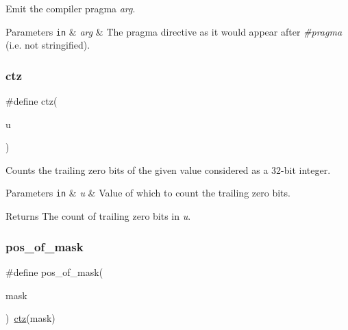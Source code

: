 Emit the compiler pragma {\itshape arg}. 


\begin{DoxyParams}[1]{Parameters}
\mbox{\tt in}  & {\em arg} & The pragma directive as it would appear after {\itshape \#pragma} (i.\+e. not stringified). \\
\hline
\end{DoxyParams}
\mbox{\label{group__doc__driver__hal__utils__macro_gab069bfec305db5213465d3b689836404}} 
\subsubsection{\texorpdfstring{ctz}{ctz}}
{\footnotesize\ttfamily \#define ctz(\begin{DoxyParamCaption}\item[{}]{u }\end{DoxyParamCaption})}



Counts the trailing zero bits of the given value considered as a 32-\/bit integer. 


\begin{DoxyParams}[1]{Parameters}
\mbox{\tt in}  & {\em u} & Value of which to count the trailing zero bits.\\
\hline
\end{DoxyParams}
\begin{DoxyReturn}{Returns}
The count of trailing zero bits in {\itshape u}. 
\end{DoxyReturn}
\mbox{\label{group__doc__driver__hal__utils__macro_ga6e6ec9c159cae4680d073d707063fa0e}} 
\subsubsection{\texorpdfstring{pos\+\_\+of\+\_\+mask}{pos\_of\_mask}}
{\footnotesize\ttfamily \#define pos\+\_\+of\+\_\+mask(\begin{DoxyParamCaption}\item[{}]{mask }\end{DoxyParamCaption})~\hyperlink{group__doc__driver__hal__utils__macro_gab069bfec305db5213465d3b689836404}{ctz}(mask)}



